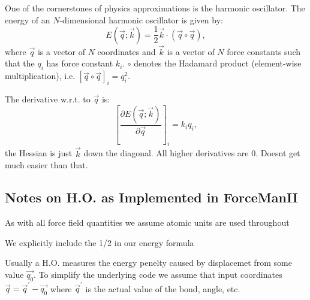 One of the cornerstones of physics\textquotesingle{} approximations is the harmonic oscillator. The energy of an $N$-\/dimensional harmonic oscillator is given by\+: \[ E(\vec{q};\vec{k})=\frac{1}{2}\vec{k}\cdot(\vec{q}\circ\vec{q}), \] where $\vec{q}$ is a vector of $N$ coordinates and $\vec{k}$ is a vector of $N$ force constants such that the $q_i$ has force constant $k_i$. $\circ$ denotes the Hadamard product (element-\/wise multiplication), i.\+e. $\left[\vec{q}\circ\vec{q}\right]_{i}=q_i^2$.

The derivative w.\+r.\+t. to $\vec{q}$ is\+: \[ \left[\frac{\partial E(\vec{q};\vec{k})}{\partial\vec{q}}\right]_i=k_i q_i, \] the Hessian is just $\vec{k}$ down the diagonal. All higher derivatives are 0. Doesn\textquotesingle{}t get much easier than that.

\subsection*{Notes on H.\+O. as Implemented in Force\+Man\+II}


\begin{DoxyItemize}
\item As with all force field quantities we assume atomic units are used throughout
\item We explicitly include the 1/2 in our energy formula
\item Usually a H.\+O. measures the energy penelty caused by displacemet from some value $\vec{q_0}$. To simplify the underlying code we assume that input coordinates $\vec{q}=\vec{q}^\prime-\vec{q_0}$ where $\vec{q}^\prime$ is the actual value of the bond, angle, etc. 
\end{DoxyItemize}